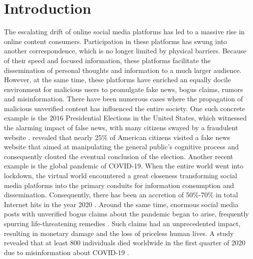 \documentclass[11pt]{article}
\begin{document}
\section{Introduction}
The escalating drift of online social media platforms has led to a massive rise in online content consumers. Participation in these platforms has swung into another correspondence, which is no longer limited by physical barriers. Because of their speed and focused information, these platforms facilitate the dissemination of personal thoughts and information to a much larger audience. However, at the same time, these platforms have enriched an equally docile environment for malicious users to promulgate fake news, bogus claims, rumors and misinformation. There have been numerous cases where the propagation of malicious unverified content has influenced the entire society. One such concrete example is the $2016$ Presidential Elections in the United States, which witnessed the alarming impact of false news, with many citizens swayed by a fraudulent website \cite{grave2018learning}. \citet{allcott2017social} revealed that nearly 25\% of American citizens visited a fake news website that aimed at manipulating the general public's cognitive process and consequently clouted the eventual conclusion of the election. Another recent example is the global pandemic of COVID-19. When the entire world went into lockdown, the virtual world encountered a great closeness transforming social media platforms into the primary conduits for information consumption and dissemination. Consequently, there has been an accretion of 50\%-70\% in total Internet hits in the year 2020 \cite{beech_2020}.  Around the same time, enormous social media posts with unverified bogus claims about the pandemic began to arise, frequently spurring life-threatening remedies \cite{naeem2020covid}. Such claims had an unprecedented impact, resulting in monetary damage and the loss of priceless human lives. A study revealed that at least 800 individuals died worldwide in the first quarter of 2020 due to misinformation about COVID-19 \cite{coleman_2020}.  \\
\end{document}
